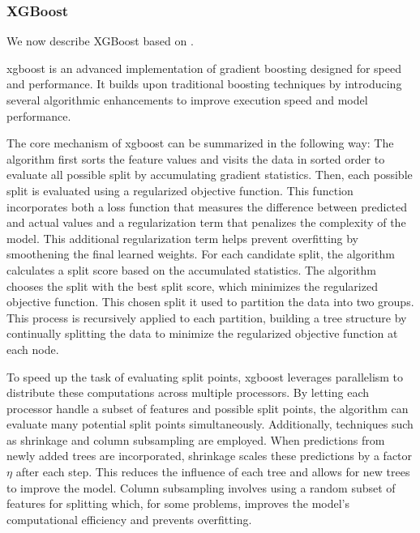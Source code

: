 \subsubsection{XGBoost}
We now describe XGBoost based on \citet{ChenGuestrin2016}.

\gls{xgboost} is an advanced implementation of gradient boosting designed for speed and performance. 
It builds upon traditional boosting techniques by introducing several algorithmic enhancements to improve execution speed and model performance.

The core mechanism of \gls{xgboost} can be summarized in the following way:
The algorithm first sorts the feature values and visits the data in sorted order to evaluate all possible split by accumulating gradient statistics.
Then, each possible split is evaluated using a regularized objective function. 
This function incorporates both a loss function that measures the difference between predicted and actual values and a regularization term that penalizes the complexity of the model.
This additional regularization term helps prevent overfitting by smoothening the final learned weights.
For each candidate split, the algorithm calculates a split score based on the accumulated statistics. 
The algorithm chooses the split with the best split score, which minimizes the regularized objective function.
This chosen split it used to partition the data into two groups.
This process is recursively applied to each partition, building a tree structure by continually splitting the data to minimize the regularized objective function at each node.

To speed up the task of evaluating split points, \gls{xgboost} leverages parallelism to distribute these computations across multiple processors. 
By letting each processor handle a subset of features and possible split points, the algorithm can evaluate many potential split points simultaneously.
Additionally, techniques such as shrinkage and column subsampling are employed. 
When predictions from newly added trees are incorporated, shrinkage scales these predictions by a factor $\eta$ after each step.
This reduces the influence of each tree and allows for new trees to improve the model.
Column subsampling involves using a random subset of features for splitting which, for some problems, improves the model's computational efficiency and prevents overfitting.

